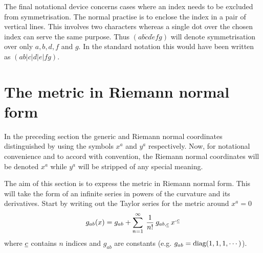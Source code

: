 \documentclass[a4paper,12pt]{article}
\numberwithin{equation}{section}
\begin{document}
The final notational device concerns cases where an index needs to be excluded from
symmetrisation. The normal practise is to enclose the index in a pair of vertical lines.
This involves two characters whereas a single dot over the chosen index can serve the same
purpose. Thus $(ab{\Dot c}d{\Dot e}fg)$ will denote symmetrisation over only $a,b,d,f$ and
$g$. In the standard notation this would have been written as $(ab\vert c\vert d\vert e\vert
fg)$.

\section{The metric in Riemann normal form}\label{sec:MetricRNC}

In the preceding section the generic and Riemann normal coordinates distinguished by using
the symbols $x^a$ and $y^a$ respectively. Now, for notational convenience and to accord with
convention, the Riemann normal coordinates will be denoted $x^a$ while $y^a$ will be
stripped of any special meaning.

The aim of this section is to express the metric in Riemann normal form. This will take the
form of an infinite series in powers of the curvature and its derivatives. Start by writing
out the Taylor series for the metric around $x^a=0$
\[
g_{ab}(x) = g_{ab} + \sum_{n=1}^\infty\> \frac{1}{n!}\>g_{ab,\uc}\>x^{\Xdot\uc}
\]
where $\uc$ contains $n$ indices and $g_{ab}$ are constants (e.g.
$g_{ab}=\hbox{\rm diag}(1,1,1,\cdots)$).
\end{document}
